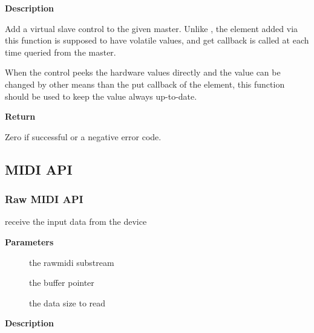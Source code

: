 \documentclass[a4paper,8pt,english]{sphinxmanual}
\begin{document}
\textbf{Description}

Add a virtual slave control to the given master.
Unlike {\hyperref[sound/kernel\string-api/alsa\string-driver\string-api:c.snd_ctl_add_slave]{\emph{}}}, the element added via this function
is supposed to have volatile values, and get callback is called
at each time queried from the master.

When the control peeks the hardware values directly and the value
can be changed by other means than the put callback of the element,
this function should be used to keep the value always up-to-date.

\textbf{Return}

Zero if successful or a negative error code.


\subsection{MIDI API}
\label{sound/kernel-api/alsa-driver-api:midi-api}

\subsubsection{Raw MIDI API}
\label{sound/kernel-api/alsa-driver-api:raw-midi-api}

\begin{fulllineitems}
\label{sound/kernel-api/alsa-driver-api:c.snd_rawmidi_receive}
receive the input data from the device

\end{fulllineitems}


\textbf{Parameters}
\begin{description}
\item[{}] \leavevmode
the rawmidi substream

\item[{}] \leavevmode
the buffer pointer

\item[{}] \leavevmode
the data size to read

\end{description}

\textbf{Description}
\end{document}

